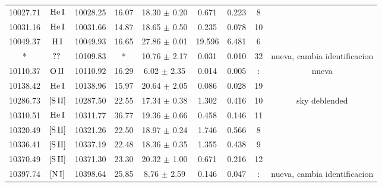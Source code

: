 \documentclass{article}
\begin{document}
\begin{table*}
\begin{adjustbox}{width=\textwidth}
\begin{tabular}{ccccccccc}
10027.71 & $\mbox{He}\thinspace \mbox{I}$ & 10028.25 & 16.07 & 18.30 $\pm$ 0.20 & 0.671 & 0.223 & 8 &  \\
10031.16 & $\mbox{He}\thinspace \mbox{I}$ & 10031.66 & 14.87 & 18.65 $\pm$ 0.50 & 0.235 & 0.078 & 10 &  \\
10049.37 & $\mbox{H}\thinspace \mbox{I}$ & 10049.93 & 16.65 & 27.86 $\pm$ 0.01 & 19.596 & 6.481 & 6 &  \\
* & $\mbox{??}\thinspace \mbox{}$ & 10109.83 & * & 10.76 $\pm$ 2.17 & 0.031 & 0.010 & 32 &  nueva, cambia identificacion \\
10110.37 & $\mbox{O}\thinspace \mbox{II}$ & 10110.92 & 16.29 & 6.02 $\pm$ 2.35 & 0.014 & 0.005 & : &  nueva \\
10138.42 & $\mbox{He}\thinspace \mbox{I}$ & 10138.96 & 15.97 & 20.64 $\pm$ 2.05 & 0.086 & 0.028 & 19 &  \\
10286.73 & $\mbox{[S}\thinspace \mbox{II]}$ & 10287.50 & 22.55 & 17.34 $\pm$ 0.38 & 1.302 & 0.416 & 10 &  sky deblended \\
10310.51 & $\mbox{He}\thinspace \mbox{I}$ & 10311.77 & 36.77 & 19.36 $\pm$ 0.66 & 0.458 & 0.146 & 11 &  \\
10320.49 & $\mbox{[S}\thinspace \mbox{II]}$ & 10321.26 & 22.50 & 18.97 $\pm$ 0.24 & 1.746 & 0.566 & 8 &  \\
10336.41 & $\mbox{[S}\thinspace \mbox{II]}$ & 10337.19 & 22.48 & 18.36 $\pm$ 0.35 & 1.355 & 0.438 & 9 &  \\
10370.49 & $\mbox{[S}\thinspace \mbox{II]}$ & 10371.30 & 23.30 & 20.32 $\pm$ 1.00 & 0.671 & 0.216 & 12 &  \\
10397.74 & $\mbox{[N}\thinspace \mbox{I]}$ & 10398.64 & 25.85 & 8.76 $\pm$ 2.59 & 0.146 & 0.047 & : &  nueva, cambia identificacion \\
\hline
\end{tabular}
\end{adjustbox}
\end{table*}
\end{document}
